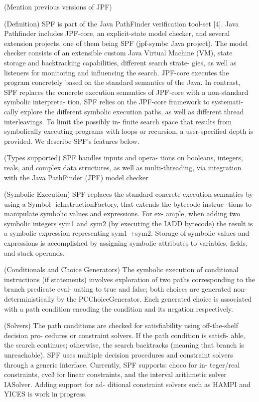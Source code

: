 \label{subsec:spf}

(Mention previous versions of JPF)~\cite{Khurshid2003,Visser2008,Anand2007}

(Definition) SPF is part of the Java PathFinder verification tool-set [4]. Java Pathfinder includes JPF-core, an explicit-state model checker, and several extension projects, one of them being SPF (jpf-symbc Java project). The model checker consists of an extensible custom Java Virtual Machine (VM), state storage and backtracking capabilities, different search strate- gies, as well as listeners for monitoring and influencing the search. JPF-core executes the program concretely based on the standard semantics of the Java. In contrast, SPF replaces the concrete execution semantics of JPF-core with a non-standard symbolic interpreta- tion. SPF relies on the JPF-core framework to systemati- cally explore the different symbolic execution paths, as well as different thread interleavings. To limit the possibly in- finite search space that results from symbolically executing programs with loops or recursion, a user-specified depth is provided. We describe SPF’s features below.~\cite{Pasareanu2010}

(Types supported) SPF handles inputs and opera- tions on booleans, integers, reals, and complex data structures, as well as multi-threading, via integration with the Java PathFinder (JPF) model checker~\cite{Luckow2014}

(Symbolic Execution) SPF replaces the standard concrete execution semantics by using a Symbol- icInstructionFactory, that extends the bytecode instruc- tions to manipulate symbolic values and expressions. For ex- ample, when adding two symbolic integers sym1 and sym2 (by executing the IADD bytecode) the result is a symbolic expression representing sym1 +sym2. Storage of symbolic values and expressions is accomplished by assigning symbolic attributes to variables, fields, and stack operands.~\cite{Pasareanu2010}

(Conditionals and Choice Generators) The symbolic execution of conditional instructions (if statements) involves exploration of two paths corresponding to the branch predicate eval- uating to true and false; both choices are generated non- deterministically by the PCChoiceGenerator. Each generated choice is associated with a path condition encoding the condition and its negation respectively.~\cite{Pasareanu2010}

(Solvers) The path conditions are checked for satisfiability using off-the-shelf decision pro- cedures or constraint solvers. If the path condition is satisfi- able, the search continues; otherwise, the search backtracks (meaning that branch is unreachable). SPF uses multiple decision procedures and constraint solvers through a generic interface. Currently, SPF supports: choco for in- teger/real constraints, cvc3 for linear constraints, and the interval arithmetic solver IASolver. Adding support for ad- ditional constraint solvers such as HAMPI and YICES is work in progress.~\cite{Pasareanu2010}


